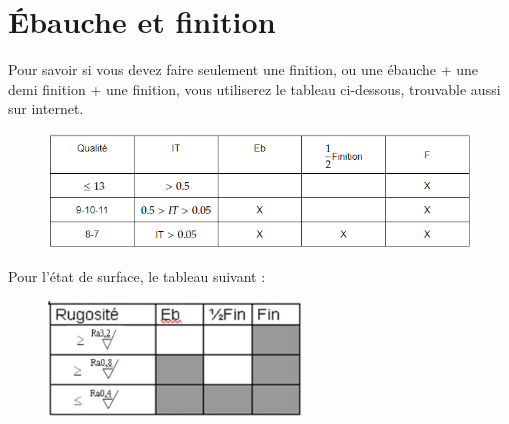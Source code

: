 \documentclass[
	11pt, %
	fleqn, %
	a4paper, %
]{LegrandOrangeBook}
\begin{document}
\section{Ébauche et finition}
Pour savoir si vous devez faire seulement une finition, ou une ébauche + une demi finition + une finition, vous utiliserez le tableau ci-dessous, trouvable aussi sur internet.
 \begin{figure}[H] %
	\centering %
	\includegraphics[width=1\textwidth]{Images/Ebauche.PNG} %

	\label{fig:placeholder} %
\end{figure}

Pour l'état de surface, le tableau suivant :
 \begin{figure}[H] %
	\centering %
	\includegraphics[width=0.6\textwidth]{Images/Ebauche2.PNG} %

	\label{fig:placeholder} %
\end{figure}


\newpage
\end{document}
